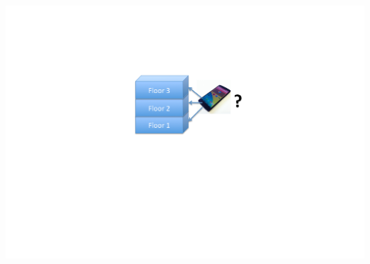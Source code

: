 \documentclass[xcolor=svgnames,english,handout]{beamer}
\begin{document}
\begin{frame}
\begin{columns}
\begin{column}{0.3\textwidth}
  \includegraphics[width=\columnwidth]{floor}
  \end{column}
  \end{columns}
\end{frame}
\end{document}
